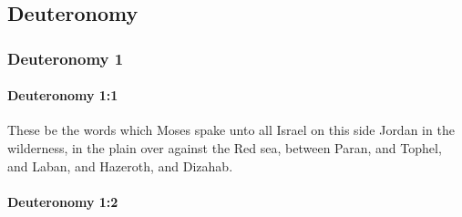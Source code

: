 \subsection{Deuteronomy}
	\label{DEUTERONOMY}

	\subsubsection{Deuteronomy 1} %
		\label{DEUTERONOMY-1}

		\paragraph{Deuteronomy 1:1} %
			\label{DEUTERONOMY-1-1}

			These be the words which Moses spake unto all Israel on this side Jordan in the wilderness, in the plain over against the Red sea, between Paran, and Tophel, and Laban, and Hazeroth, and Dizahab.


		\paragraph{Deuteronomy 1:2} %
			\label{DEUTERONOMY-1-2}

